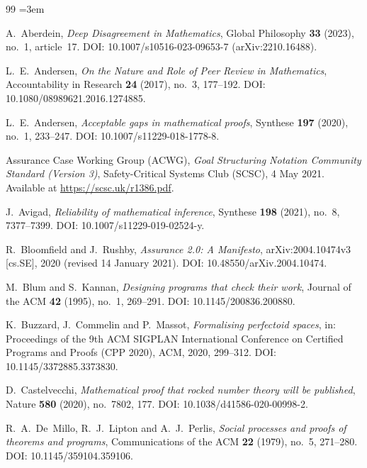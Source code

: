 \documentclass[11pt,a4paper]{article}
\begin{document}
\begin{thebibliography}{99}
\frenchspacing
\sloppy
\emergencystretch=3em


A.~Aberdein,
\emph{Deep Disagreement in Mathematics},
Global Philosophy \textbf{33} (2023), no.~1, article~17.
DOI: 10.1007/s10516-023-09653-7 (arXiv:2210.16488).

L.~E.~Andersen,
\emph{On the Nature and Role of Peer Review in Mathematics},
Accountability in Research \textbf{24} (2017), no.~3, 177--192.
DOI: 10.1080/08989621.2016.1274885.

L.~E.~Andersen,
\emph{Acceptable gaps in mathematical proofs},
Synthese \textbf{197} (2020), no.~1, 233--247.
DOI: 10.1007/s11229-018-1778-8.

Assurance Case Working Group (ACWG),
\emph{Goal Structuring Notation Community Standard (Version 3)},
Safety-Critical Systems Club (SCSC), 4 May 2021.
Available at \url{https://scsc.uk/r1386.pdf}.

J.~Avigad,
\emph{Reliability of mathematical inference},
Synthese \textbf{198} (2021), no.~8, 7377--7399.
DOI: 10.1007/s11229-019-02524-y.

R.~Bloomfield and J.~Rushby,
\emph{Assurance 2.0: A Manifesto},
arXiv:2004.10474v3 [cs.SE], 2020 (revised 14 January 2021).
DOI: 10.48550/arXiv.2004.10474.

M.~Blum and S.~Kannan,
\emph{Designing programs that check their work},
Journal of the ACM \textbf{42} (1995), no.~1, 269--291.
DOI: 10.1145/200836.200880.

K.~Buzzard, J.~Commelin and P.~Massot,
\emph{Formalising perfectoid spaces},
in: Proceedings of the 9th ACM SIGPLAN International Conference on
Certified Programs and Proofs (CPP 2020), ACM, 2020, 299--312.
DOI: 10.1145/3372885.3373830.

D.~Castelvecchi,
\emph{Mathematical proof that rocked number theory will be published},
Nature \textbf{580} (2020), no.~7802, 177.
DOI: 10.1038/d41586-020-00998-2.

R.~A.~De~Millo, R.~J.~Lipton and A.~J.~Perlis,
\emph{Social processes and proofs of theorems and programs},
Communications of the ACM \textbf{22} (1979), no.~5, 271--280.
DOI: 10.1145/359104.359106.


\end{thebibliography}
\end{document}
